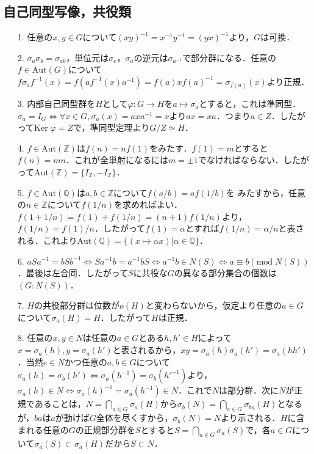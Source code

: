 \documentclass[a4paper,10pt,uplatex]{jsarticle}
\newcommand{\Z}{\mathbb{Z}}
\newcommand{\Q}{\mathbb{Q}}
\newcommand{\Mod}{\text{mod}\;}
\newcommand{\Ker}{\text{Ker}\;}
\newcommand{\Aut}{\text{Aut}}
\numberwithin{equation}{section}
\theoremstyle{mystyle}
\begin{document}
\subsection{自己同型写像，共役類}
\begin{itemize}
    \item[1.] 任意の$x,y \in G$について$(xy)^{-1} = x^{-1}y^{-1} = (yx)^{-1}$より，$G$は可換．
    \item[2.] $\sigma_a\sigma_b = \sigma_{ab}$，単位元は$\sigma_e$，$\sigma_a$の逆元は$\sigma_{a^{-1}}$で部分群になる．任意の$f \in \Aut(G)$について$f\sigma_af^{-1}(x) = f(af^{-1}(x)a^{-1}) = f(a)xf(a)^{-1} = \sigma_{f(a)}(x)$より正規．
    \item[3.] 内部自己同型群を$H$として$\varphi:G \to H$を$a \mapsto \sigma_a$とすると，これは準同型．$\sigma_a = I_G \Leftrightarrow \forall x \in G, \sigma_a(x) = axa^{-1} = x$より$ax = xa$．つまり$a \in Z$．したがって$\Ker \varphi = Z$で，準同型定理より$G/Z \simeq H$．
    \item[4.] $f \in \Aut(\Z)$は$f(n) = nf(1)$をみたす．$f(1) = m$とすると$f(n) = mn$．これが全単射になるには$m = \pm 1$でなければならない．したがって$\Aut(\Z) = \{I_\Z, -I_\Z\}$．
    \item[5.] $f \in \Aut(\Q)$は$a,b \in \Z$について$f(a/b) = af(1/b)$を
    みたすから，任意の$n \in \Z$について$f(1/n)$を求めればよい．$f(1+1/n) = f(1) + f(1/n) = (n+1)f(1/n)$より，$f(1/n) = f(1)/n$．したがって$f(1) = \alpha$とすれば$f(1/n) = \alpha/n$と表される．これより$\Aut(\Q) = \{(x \mapsto \alpha x)| \alpha \in \Q\}$．
    \item[6.] $aSa^{-1} = bSb^{-1} \Leftrightarrow Sa^{-1}b = a^{-1}bS \Leftrightarrow a^{-1}b \in N(S) \Leftrightarrow a \equiv b(\Mod N(S))$．最後は左合同．したがって$S$に共役な$G$の異なる部分集合の個数は$(G:N(S))$．
    \item[7.] $H$の共役部分群は位数が$o(H)$と変わらないから，仮定より任意の$a \in G$について$\sigma_a(H) = H$．したがって$H$は正規．
    \item[8.] 任意の$x,y \in N$は任意の$a \in G$とある$h,h' \in H$によって$x = \sigma_a(h),y = \sigma_a(h')$と表されるから，$xy = \sigma_a(h)\sigma_a(h') = \sigma_a(hh')$．当然$e \in N$かつ任意の$a,b \in G$について$\sigma_a(h) = \sigma_b(h') \Leftrightarrow \sigma_a(h^{-1}) = \sigma_b(h'^{-1})$より，$\sigma_a(h) \in N \Leftrightarrow \sigma_a(h)^{-1} = \sigma_a(h^{-1}) \in N$．これで$N$は部分群．次に$N$が正規であることは，$N = \bigcap_{a \in G} \sigma_a(H)$から$\sigma_b(N) = \bigcap_{a \in G} \sigma_{ba}(H)$となるが，$ba$は$a$が動けば$G$全体を尽くすから，$\sigma_b(N) = N$より示される．$H$に含まれる任意の$G$の正規部分群を$S$とすると$S = \bigcap_{a \in G} \sigma_a(S)$で，各$a \in G$について$\sigma_a(S) \subset \sigma_a(H)$だから$S \subset N$．
\end{itemize}
\end{document}
